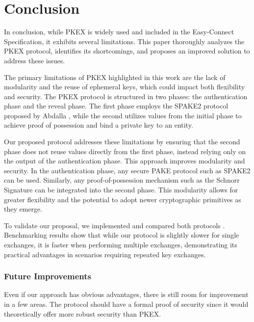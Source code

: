 \section{Conclusion}

In conclusion, while PKEX \cite{harkins-pkex-06} is widely used and included in
the Easy-Connect Specification, it exhibits several limitations. This paper
thoroughly analyzes the PKEX protocol, identifies its shortcomings, and
proposes an improved solution to address these issues.

The primary limitations of PKEX highlighted in this work are the lack of
modularity and the reuse of ephemeral keys, which could impact both flexibility
and security. The PKEX protocol is structured in two phases: the authentication
phase and the reveal phase. The first phase employs the SPAKE2 protocol
proposed by Abdalla \cite{Abdalla_2005}, while the second utilizes values from
the initial phase to achieve proof of possession and bind a private key to an
entity.

Our proposed protocol addresses these limitations by ensuring that the second
phase does not reuse values directly from the first phase, instead relying
only on the output of the authentication phase. This approach improves
modularity and security. In the authentication phase, any secure PAKE
protocol such as SPAKE2 can be used. Similarly, any proof-of-possession
mechanism such as the Schnorr Signature can be integrated into the second
phase. This modularity allows for greater flexibility and the potential to
adopt newer cryptographic primitives as they emerge.

To validate our proposal, we implemented and compared both protocols
\cite{malga_steve}. Benchmarking results show that while our protocol is
slightly slower for single exchanges, it is faster when performing multiple
exchanges, demonstrating its practical advantages in scenarios requiring
repeated key exchanges.

\subsubsection{Future Improvements}

Even if our approach has obvious advantages, there is still room for
improvement in a few areas. The protocol should have a formal proof of security
since it would theoretically offer more robust security than PKEX.
